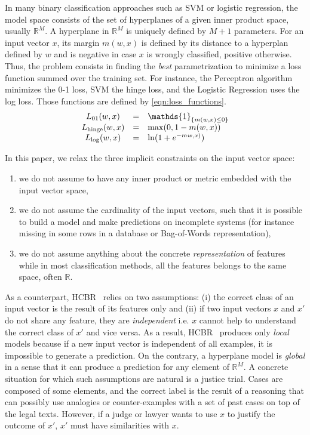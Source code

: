 \documentclass[sigconf,edbt]{acmart-edbt-workshops}
\def\HCBR{{\sc HCBR}}
\begin{document}
In many binary classification approaches such as SVM or logistic regression, the model space consists of the set of hyperplanes of a given inner product space, usually $\mathbb{R}^M$. A hyperplane in $\mathbb{R}^M$ is uniquely defined by $M+1$ parameters. For an input vector $x$, its margin $m(w,x)$ is defined by its distance to a hyperplan defined by $w$ and is negative in case $x$ is wrongly classified, positive otherwise. Thus, the problem consists in finding the {\it best} parametrization to minimize a loss function summed over the training set. For instance, the Perceptron algorithm minimizes the 0-1 loss, SVM the hinge loss, and the Logistic Regression uses the log loss. Those functions are defined by \eqref{eqn:loss_functions}.
\begin{align}
  \label{eqn:loss_functions}
  \begin{matrix}
    L_{01}({w}, {x}) & = & \mathds{1}_{\{ m({w}, {x}) \leq 0 \}} \hfill \\
    L_{\text{hinge}}({w}, {x}) & = & \max(0, 1 - m({w}, {x})) \hfill \\
    L_{\log}({w}, {x}) & = & \ln(1 + e^{- m{w}, {x})}) \hfill
  \end{matrix}
\end{align}

In this paper, we relax the three implicit constraints on the input vector space:
\begin{enumerate}
\item we do not assume to have any inner product or metric embedded with the input vector space,
\item we do not assume the cardinality of the input vectors, such that it is possible to build a model and make predictions on incomplete systems (for instance missing in some rows in a database or Bag-of-Words representation),
\item we do not assume anything about the concrete {\it representation} of features while in most classification methods, all the features belongs to the same space, often $\mathbb{R}$.
\end{enumerate}
As a counterpart, \HCBR~ relies on two assumptions: (i) the correct class of an input vector is the result of its features only and (ii) if two input vectors $x$ and $x'$ do not share any feature, they are {\it independent} i.e. $x$ cannot help to understand the correct class of $x'$ and vice versa. As a result, \HCBR~  produces only {\it local} models because if a new input vector is independent of all examples, it is impossible to generate a prediction. On the contrary, a hyperplane model is {\it global} in a sense that it can produce a prediction for any element of $\mathbb{R}^M$.
A concrete situation for which such assumptions are natural is a justice trial. Cases are composed of some elements, and the correct label is the result of a reasoning that can possibly use analogies or counter-examples with a set of past cases on top of the legal texts. However, if a judge or lawyer wants to use $x$ to justify the outcome of $x'$, $x'$ must have similarities with $x$.
\end{document}
